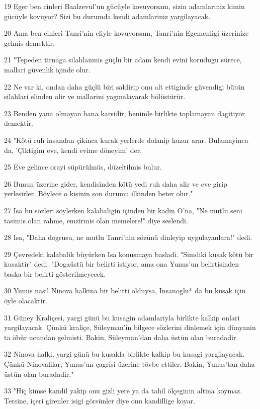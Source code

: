 \par 19 Eger ben cinleri Baalzevul'un gücüyle kovuyorsam, sizin adamlariniz kimin gücüyle kovuyor? Sizi bu durumda kendi adamlariniz yargilayacak.
\par 20 Ama ben cinleri Tanri'nin eliyle kovuyorsam, Tanri'nin Egemenligi üzerinize gelmis demektir.
\par 21 "Tepeden tirnaga silahlanmis güçlü bir adam kendi evini korudugu sürece, mallari güvenlik içinde olur.
\par 22 Ne var ki, ondan daha güçlü biri saldirip onu alt ettiginde güvendigi bütün silahlari elinden alir ve mallarini yagmalayarak bölüstürür.
\par 23 Benden yana olmayan bana karsidir, benimle birlikte toplamayan dagitiyor demektir.
\par 24 "Kötü ruh insandan çikinca kurak yerlerde dolanip huzur arar. Bulamayinca da, 'Çiktigim eve, kendi evime döneyim' der.
\par 25 Eve gelince orayi süpürülmüs, düzeltilmis bulur.
\par 26 Bunun üzerine gider, kendisinden kötü yedi ruh daha alir ve eve girip yerlesirler. Böylece o kisinin son durumu ilkinden beter olur."
\par 27 Isa bu sözleri söylerken kalabaligin içinden bir kadin O'na, "Ne mutlu seni tasimis olan rahme, emzirmis olan memelere!" diye seslendi.
\par 28 Isa, "Daha dogrusu, ne mutlu Tanri'nin sözünü dinleyip uygulayanlara!" dedi.
\par 29 Çevredeki kalabalik büyürken Isa konusmaya basladi. "Simdiki kusak kötü bir kusaktir" dedi. "Dogaüstü bir belirti istiyor, ama ona Yunus'un belirtisinden baska bir belirti gösterilmeyecek.
\par 30 Yunus nasil Ninova halkina bir belirti olduysa, Insanoglu* da bu kusak için öyle olacaktir.
\par 31 Güney Kraliçesi, yargi günü bu kusagin adamlariyla birlikte kalkip onlari yargilayacak. Çünkü kraliçe, Süleyman'in bilgece sözlerini dinlemek için dünyanin ta öbür ucundan gelmisti. Bakin, Süleyman'dan daha üstün olan buradadir.
\par 32 Ninova halki, yargi günü bu kusakla birlikte kalkip bu kusagi yargilayacak. Çünkü Ninovalilar, Yunus'un çagrisi üzerine tövbe ettiler. Bakin, Yunus'tan daha üstün olan buradadir."
\par 33 "Hiç kimse kandil yakip onu gizli yere ya da tahil ölçeginin altina koymaz. Tersine, içeri girenler isigi görsünler diye onu kandillige koyar.
